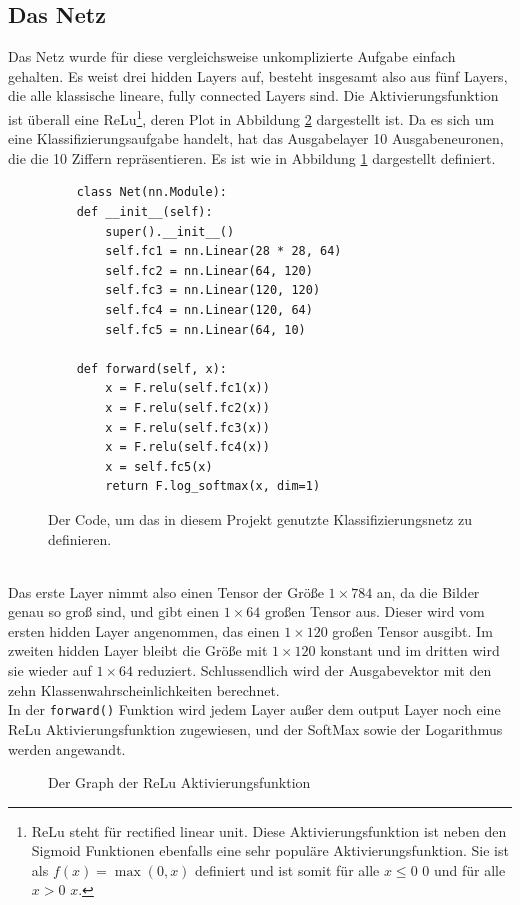 \documentclass[11pt]{article}
\begin{document}
\subsection{Das Netz}\label{sec:das-netz}
Das Netz wurde für diese vergleichsweise unkomplizierte Aufgabe einfach gehalten. Es weist drei hidden Layers auf, besteht insgesamt also aus fünf Layers, die alle klassische lineare, fully connected Layers sind. Die Aktivierungsfunktion ist überall eine ReLu\footnote{ReLu steht für rectified linear unit. Diese Aktivierungsfunktion ist neben den Sigmoid Funktionen ebenfalls eine sehr populäre Aktivierungsfunktion. Sie ist als $f(x)=\max(0,x)$ definiert und ist somit für alle $x\le0$ $0$ und für alle $x>0$ $x$.}, deren Plot in Abbildung \ref{ReLu} dargestellt ist. Da es sich um eine Klassifizierungsaufgabe handelt, hat das Ausgabelayer 10 Ausgabeneuronen, die die 10 Ziffern repräsentieren. Es ist wie in Abbildung \ref{net} dargestellt definiert.
\begin{figure}[h]
 	\begin{verbatim}
	class Net(nn.Module):
	def __init__(self):
		super().__init__()
		self.fc1 = nn.Linear(28 * 28, 64)
		self.fc2 = nn.Linear(64, 120)
		self.fc3 = nn.Linear(120, 120)
		self.fc4 = nn.Linear(120, 64)
		self.fc5 = nn.Linear(64, 10)
	
	def forward(self, x):
		x = F.relu(self.fc1(x))
		x = F.relu(self.fc2(x))
		x = F.relu(self.fc3(x))
		x = F.relu(self.fc4(x))
		x = self.fc5(x)
		return F.log_softmax(x, dim=1)
	\end{verbatim}
	\caption{Der Code, um das in diesem Projekt genutzte Klassifizierungsnetz zu definieren.}
	 \label{net}
\end{figure}
\\
Das erste Layer nimmt also einen Tensor der Größe $1\times 784$ an, da die Bilder genau so groß sind, und gibt einen $1\times 64$ großen Tensor aus. Dieser wird vom ersten hidden Layer angenommen, das einen $1\times 120$ großen Tensor ausgibt. Im zweiten hidden Layer bleibt die Größe mit $1\times 120$ konstant und im dritten wird sie wieder auf $1\times 64$ reduziert. Schlussendlich wird der Ausgabevektor mit den zehn Klassenwahrscheinlichkeiten berechnet.\\
In der \texttt{forward()} Funktion wird jedem Layer außer dem output Layer noch eine ReLu Aktivierungsfunktion zugewiesen, und der SoftMax sowie der Logarithmus werden angewandt.
\begin{figure}[h]
	\begin{center}
	\end{center}
	\caption{Der Graph der ReLu Aktivierungsfunktion}
	\label{ReLu}
\end{figure}
\end{document}
